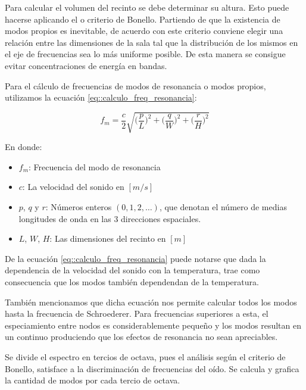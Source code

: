 \par Para calcular el volumen del recinto se debe determinar su altura. Esto puede hacerse aplicando el  o criterio de Bonello. Partiendo de que la existencia de modos propios es inevitable, de acuerdo con este criterio conviene elegir una relación entre las dimensiones de la sala tal que la distribución de los mismos en el eje de frecuencias sea lo más uniforme posible. De esta manera se consigue evitar concentraciones de energía en bandas.

\par Para el cálculo de frecuencias de modos de resonancia o modos propios, utilizamos la ecuación \eqref{eq::calculo_freq_resonancia}:

\begin{equation}
    f_m = \frac{c}{2} \sqrt{\Big(\frac{p}{L} \Big)^2 + \Big(\frac{q}{W} \Big)^2 + \Big(\frac{r}{H} \Big)^2 }
    \label{eq::calculo_freq_resonancia}
\end{equation}

\par En donde:
\begin{itemize}
    \item $f_m$: Frecuencia del modo de resonancia
    \item $c$: La velocidad del sonido en $[m/s]$
    \item $p$, $q$ y $r$: Números enteros $(0, 1, 2, \ldots)$, que denotan el número de medias longitudes de onda en las 3 direcciones espaciales.
    \item $L$, $W$, $H$: Las dimensiones del recinto en $[m]$
\end{itemize}

\par De la ecuación \eqref{eq::calculo_freq_resonancia} puede notarse que dada la dependencia de la velocidad del sonido con la temperatura, trae como consecuencia que los modos también dependendan de la temperatura.

\par También mencionamos que dicha ecuación nos permite calcular todos los modos hasta la frecuencia de Schroederer. Para frecuencias superiores a esta, el especiamiento entre nodos es considerablemente pequeño y los modos resultan en un continuo produciendo que los efectos de resonancia no sean apreciables.\\

\par Se divide el espectro en tercios de octava, pues el análisis según el criterio de Bonello, satisface a la discriminación de frecuencias del oído. Se calcula y grafica la cantidad de modos por cada tercio de octava.

